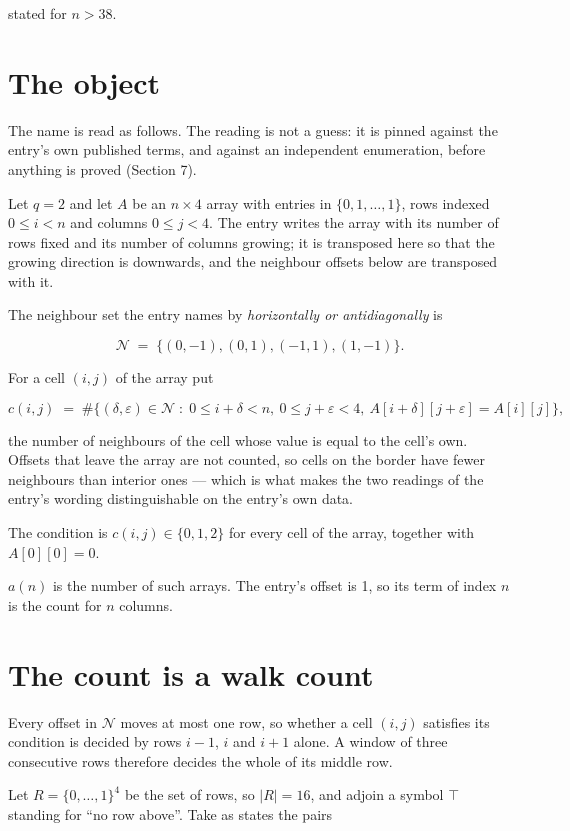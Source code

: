 \documentclass[11pt]{article}
\theoremstyle{definition}
\begin{document}
stated for $n > 38$.

\section{The object}

The name is read as follows. The reading is not a guess: it is pinned against the entry's own published terms, and against an independent enumeration, before anything is proved (Section 7).

Let $q = 2$ and let $A$ be an $n \times 4$ array with entries in $\{0,1,\dots,1\}$, rows indexed $0 \le i < n$ and columns $0 \le j < 4$. The entry writes the array with its number of rows fixed and its number of columns growing; it is transposed here so that the growing direction is downwards, and the neighbour offsets below are transposed with it.

The neighbour set the entry names by {\itshape horizontally or antidiagonally} is

\[\mathcal{N} \;=\; \{(0,-1), (0,1), (-1,1), (1,-1)\}.\]

For a cell $(i,j)$ of the array put

\[c(i,j) \;=\; \#\bigl\{(\delta,\varepsilon)\in\mathcal{N} \;:\; 0\le i+\delta<n,\ 0\le j+\varepsilon<4,\ A[i+\delta][j+\varepsilon] = A[i][j]\bigr\},\]

the number of neighbours of the cell whose value is equal to the cell's own. Offsets that leave the array are not counted, so cells on the border have fewer neighbours than interior ones --- which is what makes the two readings of the entry's wording distinguishable on the entry's own data.

The condition is $c(i,j) \in \{0, 1, 2\}$ for every cell of the array, together with $A[0][0]=0$.

$a(n)$ is the number of such arrays. The entry's offset is 1, so its term of index $n$ is the count for $n$ columns.

\section{The count is a walk count}

Every offset in $\mathcal{N}$ moves at most one row, so whether a cell $(i,j)$ satisfies its condition is decided by rows $i-1$, $i$ and $i+1$ alone. A window of three consecutive rows therefore decides the whole of its middle row.

Let $R = \{0,\dots,1\}^{4}$ be the set of rows, so $|R| = 16$, and adjoin a symbol $\top$ standing for ``no row above''. Take as states the pairs
\end{document}
